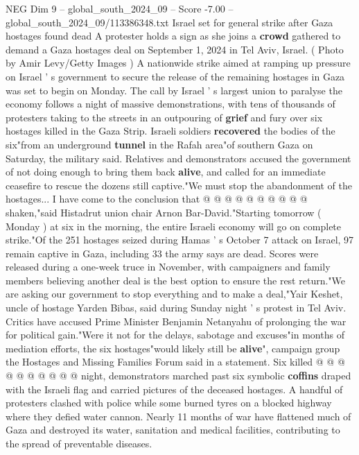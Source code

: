 \begin{textsample}{NEG Dim 9 – global\_south\_2024\_09 – Score -7.00 – global\_south\_2024\_09/113386348.txt}  \label{ex:f9_neg_110}
Israel set for general strike after Gaza hostages found dead A protester holds a sign as she joins a \textbf{crowd} gathered to demand a Gaza hostages deal on September 1, 2024 in Tel Aviv, Israel. ( Photo by Amir Levy/Getty Images ) A nationwide strike aimed at ramping up pressure on Israel ' s government to secure the release of the remaining hostages in Gaza was set to begin on Monday.
The call by Israel ' s largest union to paralyse the economy follows a night of massive demonstrations, with tens of thousands of protesters taking to the streets in an outpouring of \textbf{grief} and fury over six hostages killed in the Gaza Strip.
Israeli soldiers \textbf{recovered} the bodies of the six"from an underground \textbf{tunnel} in the Rafah area"of southern Gaza on Saturday, the military said.
Relatives and demonstrators accused the government of not doing enough to bring them back \textbf{alive}, and called for an immediate ceasefire to rescue the dozens still captive."We must stop the abandonment of the hostages...
I have come to the conclusion that @ @ @ @ @ @ @ @ @ @ shaken,"said Histadrut union chair Arnon Bar-David."Starting tomorrow ( Monday ) at six in the morning, the entire Israeli economy will go on complete strike."Of the 251 hostages seized during Hamas ' s October 7 attack on Israel, 97 remain captive in Gaza, including 33 the army says are dead.
Scores were released during a one-week truce in November, with campaigners and family members believing another deal is the best option to ensure the rest return."We are asking our government to stop everything and to make a deal,"Yair Keshet, uncle of hostage Yarden Bibas, said during Sunday night ' s protest in Tel Aviv.
Critics have accused Prime Minister Benjamin Netanyahu of prolonging the war for political gain."Were it not for the delays, sabotage and excuses"in months of mediation efforts, the six hostages"would likely still be \textbf{alive}", campaign group the Hostages and Missing Families Forum said in a statement.
Six killed @ @ @ @ @ @ @ @ @ @ night, demonstrators marched past six symbolic \textbf{coffins} draped with the Israeli flag and carried pictures of the deceased hostages.
A handful of protesters clashed with police while some burned tyres on a blocked highway where they defied water cannon.
Nearly 11 months of war have flattened much of Gaza and destroyed its water, sanitation and medical facilities, contributing to the spread of preventable diseases.

\end{textsample}
